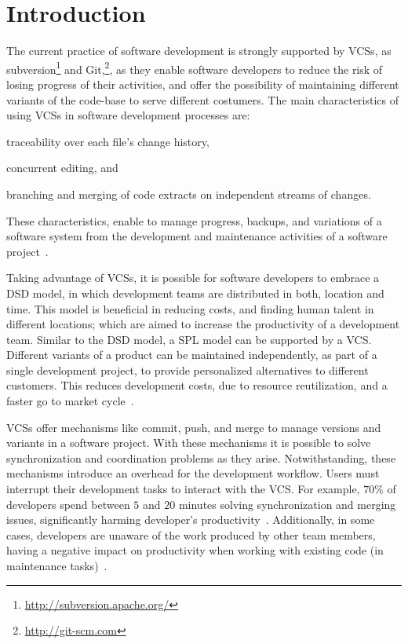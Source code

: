 
\section{Introduction}
\label{sec:introduction}

The current practice of software development is strongly supported by \acp{VCS}, as subversion\footnote{\url{http://subversion.apache.org/}} and Git,\footnote{\url{http://git-scm.com}}, as they enable software developers to reduce the risk of losing progress of their activities, and offer the possibility of maintaining different variants of the code-base to serve different costumers.
The main characteristics of using \acp{VCS} in software development processes are:
\begin{enumerate*}[label=(\arabic*)]
\item traceability over each file's change history, 
\item concurrent editing, and 
\item branching and merging of code extracts on independent streams of changes. 
\end{enumerate*}
These characteristics, enable to manage progress, backups, and variations of a software system from the development and maintenance activities of a software project~\cite{spinellis05}.

Taking advantage of \acp{VCS},  it is possible for software developers to embrace a \ac{DSD} model, in which development teams are distributed in both, location and time. This model is beneficial in reducing costs, and finding human talent in different locations; which are aimed to increase the productivity of a development team. 
Similar to the \ac{DSD} model, a \ac{SPL} model can be supported by a \ac{VCS}. Different variants of a product can be maintained independently, as part of a single development project, to provide personalized alternatives to different customers. This reduces development costs, due to resource reutilization, and a faster go to market cycle~\cite{pohl05}.  

\acp{VCS} offer mechanisms like commit, push, and merge to manage versions and variants in a software project. With these mechanisms it is possible to solve synchronization and coordination problems as they arise. 
Notwithstanding, these mechanisms introduce an overhead for the development workflow. Users must interrupt their development tasks to interact with the \ac{VCS}. For example, $70\%$ of developers spend between $5$ and  $20$ minutes solving synchronization and merging issues, significantly harming developer's productivity~\cite{estler14}. Additionally, in some cases, developers are unaware of the work produced by other team members, having a negative impact on productivity when working with existing code (\eg in maintenance tasks)~\cite{dourish92}.

